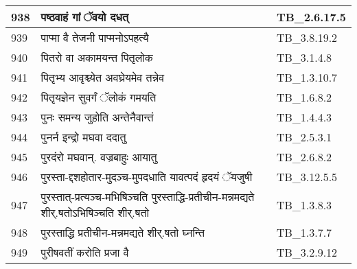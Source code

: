 \documentclass[17pt]{extarticle}
\begin{document}
\begin{longtable}{||p{0.4in}||p{4.9in}||p{0.9in}||}
    938 & पष्ठवाहं गां ॅवयो दधत् & TB\_2.6.17.5       \\
    
    \hline
        
    939 & पाप्मा वै तेजनी पाप्मनोऽपहत्यै & TB\_3.8.19.2       \\
    
    \hline
        
    940 & पितरो वा अकामयन्त पितृलोक & TB\_3.1.4.8       \\
    
    \hline
        
    941 & पितृभ्य आवृश्च्येत अवघ्रेयमेव तन्नेव & TB\_1.3.10.7       \\
    
    \hline
        
    942 & पितृयज्ञेन सुवर्गं ॅलोकं गमयति & TB\_1.6.8.2       \\
    
    \hline
        
    943 & पुनः समन्य जुहोति अन्तेनैवान्तं & TB\_1.4.4.3       \\
    
    \hline
        
    944 & पुनर्न इन्द्रो मघवा ददातु & TB\_2.5.3.1       \\
    
    \hline
        
    945 & पुरदंरो मघवान्. वज्रबाहुः आयातु & TB\_2.6.8.2       \\
    
    \hline
        
    946 & पुरस्ता{-}द्दशहोतार{-}मुदञ्च{-}मुपदधाति यावत्पदं हृदयं ॅयजुषी & TB\_3.12.5.5       \\
    
    \hline
        
    947 & पुरस्तात्{-}प्रत्यञ्च{-}मभिषिञ्चति पुरस्ताद्धि{-}प्रतीचीन{-}मन्नमद्यते शीर्.षतोऽभिषिञ्चति शीर्.षतो & TB\_1.3.8.3       \\
    
    \hline
        
    948 & पुरस्ताद्धि प्रतीचीन{-}मन्नमद्यते शीर्.षतो घ्नन्ति & TB\_1.3.7.7       \\
    
    \hline
        
    949 & पुरीषवतीं करोति प्रजा वै & TB\_3.2.9.12       \\
    
    \hline
        

\end{longtable}
\end{document}
